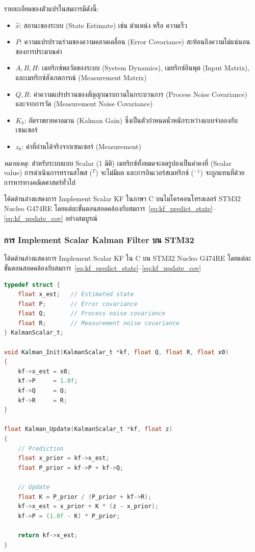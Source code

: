 รายละเอียดของตัวแปรในสมการมีดังนี้:
\begin{itemize}
    \item $\hat{x}$: สถานะของระบบ (State Estimate) เช่น ตำแหน่ง หรือ ความเร็ว
    \item $P$: ความแปรปรวนร่วมของความคลาดเคลื่อน (Error Covariance) สะท้อนถึงความไม่แน่นอนของการประมาณค่า
    \item $A, B, H$: เมทริกซ์พลวัตของระบบ (System Dynamics), เมทริกซ์อินพุต (Input Matrix), และเมทริกซ์สังเกตการณ์ (Measurement Matrix)
    \item $Q, R$: ค่าความแปรปรวนของสัญญาณรบกวนในกระบวนการ (Process Noise Covariance) และจากการวัด (Measurement Noise Covariance)
    \item $K_k$: อัตราขยายคาลมาน (Kalman Gain) ซึ่งเป็นตัวกำหนดน้ำหนักระหว่างแบบจำลองกับเซนเซอร์
    \item $z_k$: ค่าที่อ่านได้จริงจากเซนเซอร์ (Measurement)
\end{itemize}

\textit{หมายเหตุ:} สำหรับระบบแบบ Scalar (1 มิติ) เมทริกซ์ทั้งหมดจะลดรูปลงเป็นค่าคงที่ (Scalar value) การดำเนินการทรานสโพส ($^T$) จะไม่มีผล และการอินเวอร์สเมทริกซ์ ($^{-1}$) จะถูกแทนที่ด้วยการหารทางคณิตศาสตร์ทั่วไป

โค้ดด้านล่างแสดงการ Implement Scalar KF ในภาษา C บนไมโครคอนโทรลเลอร์ STM32 Nucleo G474RE โดยแต่ละขั้นตอนสอดคล้องกับสมการ~\eqref{eq:kf_predict_state}--\eqref{eq:kf_update_cov} อย่างสมบูรณ์

\subsubsection{การ Implement Scalar Kalman Filter บน STM32}

โค้ดด้านล่างแสดงการ Implement Scalar KF ใน C บน STM32 Nucleo G474RE
โดยแต่ละขั้นตอนสอดคล้องกับสมการ~\eqref{eq:kf_predict_state}--\eqref{eq:kf_update_cov}

\begin{lstlisting}[language=C, caption={Scalar Kalman Filter — kalman.c},
                   label={lst:scalar_kf}]
typedef struct {
    float x_est;   // Estimated state
    float P;       // Error covariance
    float Q;       // Process noise covariance
    float R;       // Measurement noise covariance
} KalmanScalar_t;

void Kalman_Init(KalmanScalar_t *kf, float Q, float R, float x0)
{
    kf->x_est = x0;
    kf->P     = 1.0f;
    kf->Q     = Q;
    kf->R     = R;
}

float Kalman_Update(KalmanScalar_t *kf, float z)
{
    // Prediction
    float x_prior = kf->x_est;
    float P_prior = kf->P + kf->Q;

    // Update
    float K = P_prior / (P_prior + kf->R);
    kf->x_est = x_prior + K * (z - x_prior);
    kf->P = (1.0f - K) * P_prior;

    return kf->x_est;
}
\end{lstlisting}

